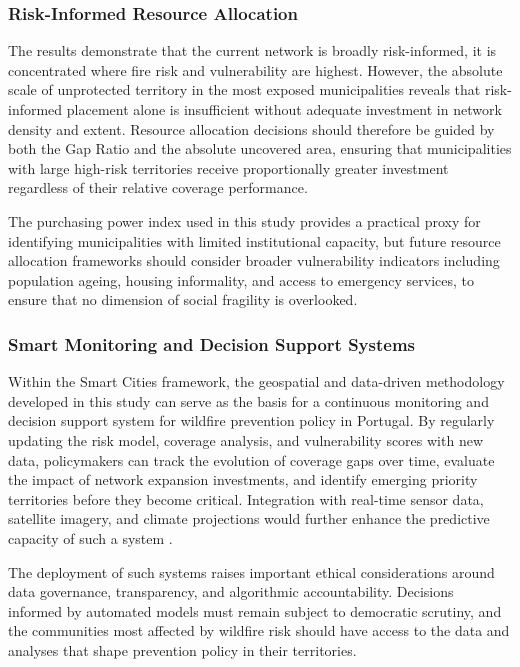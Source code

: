 \subsubsection*{Risk-Informed Resource Allocation}

The results demonstrate that the current network is broadly
risk-informed, it is concentrated where fire risk and vulnerability
are highest. However, the absolute scale of unprotected territory in
the most exposed municipalities reveals that risk-informed placement
alone is insufficient without adequate investment in network density
and extent. Resource allocation decisions should therefore be guided
by both the Gap Ratio and the absolute uncovered area, ensuring that
municipalities with large high-risk territories receive proportionally
greater investment regardless of their relative coverage performance.

The purchasing power index used in this study provides a practical
proxy for identifying municipalities with limited institutional
capacity, but future resource allocation frameworks should consider
broader vulnerability indicators including population ageing, housing
informality, and access to emergency services, to ensure that no
dimension of social fragility is overlooked.

\subsubsection*{Smart Monitoring and Decision Support Systems}

Within the Smart Cities framework, the geospatial and data-driven
methodology developed in this study can serve as the basis for a
continuous monitoring and decision support system for wildfire
prevention policy in Portugal. By regularly updating the risk model,
coverage analysis, and vulnerability scores with new data, policymakers
can track the evolution of coverage gaps over time, evaluate the
impact of network expansion investments, and identify emerging
priority territories before they become critical. Integration with
real-time sensor data, satellite imagery, and climate projections
would further enhance the predictive capacity of such a system
\cite{IoTSmartCities2024}.

The deployment of such systems raises important ethical considerations
around data governance, transparency, and algorithmic accountability.
Decisions informed by automated models must remain subject to
democratic scrutiny, and the communities most affected by wildfire
risk should have access to the data and analyses that shape prevention
policy in their territories.



